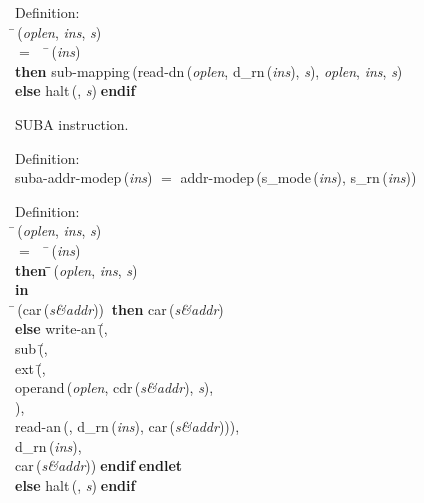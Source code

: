 \begin{tabbing}{\sc Definition}: \\  
\=\,({\it{oplen\/}}, {\it{ins\/}}, {\it{s\/}}) \\ 
$=$$\;\;\;\;$\=\,({\it{ins\/}}) \\ 
{\bf then }{\rm{sub-mapping}}\,({\rm{read-dn}}\,({\it{oplen\/}}, {\rm{d\_rn}}\,({\it{ins\/}}), {\it{s\/}}), {\it{oplen\/}}, {\it{ins\/}}, {\it{s\/}}) \\ 
{\bf else }{\rm{halt}}\,({}, {\it{s\/}})$\;${\bf  endif}\-\-
\end{tabbing}
                      
 SUBA instruction.
\begin{tabbing}{\sc Definition}: \\  
{\rm{suba-addr-modep}}\,({\it{ins\/}}) $=$ {\rm{addr-modep}}\,({\rm{s\_mode}}\,({\it{ins\/}}), {\rm{s\_rn}}\,({\it{ins\/}}))
\end{tabbing}

\begin{tabbing}{\sc Definition}: \\  
\=\,({\it{oplen\/}}, {\it{ins\/}}, {\it{s\/}}) \\ 
$=$$\;\;\;\;$\=\,({\it{ins\/}}) \\ 
{\bf then }\=\=\,({\it{oplen\/}}, {\it{ins\/}}, {\it{s\/}})\- \\ 
{\bf in} \\ 
\=\,({\rm{car}}\,({\it{s\&addr\/}}))$\;\;${\bf then }{\rm{car}}\,({\it{s\&addr\/}}) \\ 
{\bf else }{\rm{write-an}}\,(\=, \\ 
{\rm{sub}}\,(\=, \\ 
{\rm{ext}}\,(\=, \\ 
{\rm{operand}}\,({\it{oplen\/}}, {\rm{cdr}}\,({\it{s\&addr\/}}), {\it{s\/}}), \\ 
{})\-, \\ 
{\rm{read-an}}\,({}, {\rm{d\_rn}}\,({\it{ins\/}}), {\rm{car}}\,({\it{s\&addr\/}})))\-, \\ 
{\rm{d\_rn}}\,({\it{ins\/}}), \\ 
{\rm{car}}\,({\it{s\&addr\/}}))\-$\;${\bf  endif}\-$\;${\bf  endlet}\- \\ 
{\bf else }{\rm{halt}}\,({}, {\it{s\/}})$\;${\bf  endif}\-\-
\end{tabbing}

